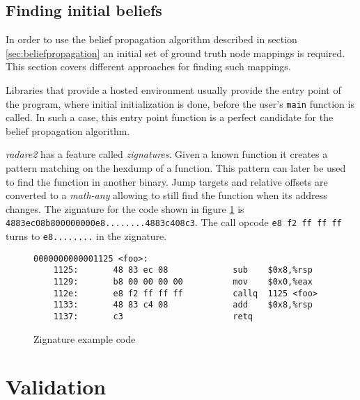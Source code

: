 \documentclass[
    12pt,                               %
    DIV=14,                     %
    parskip=half+,              %
    bigheadings,                %
    cleardoubleempty,   %
    halfparskip,                %
    ]{scrreprt} %
\begin{document}
\section{Finding initial beliefs} \label{sec:findtruth}
In order to use the belief propagation algorithm described in section \ref{sec:beliefpropagation} an initial set of ground truth node mappings is required. This section covers different approaches for finding such mappings.

Libraries that provide a hosted environment usually provide the entry point of the program, where initial initialization is done, before the user's \verb'main' function is called. In such a case, this entry point function is a perfect candidate for the belief propagation algorithm.

\textit{radare2} has a feature called \textit{zignatures}\cite{zignatures}. Given a known function it creates a pattern matching on the hexdump of a function. This pattern can later be used to find the function in another binary. Jump targets and relative offsets are converted to a \textit{math-any} allowing to still find the function when its address changes. The zignature for the code shown in figure \ref{fig:zignatures} is \verb'4883ec08b800000000e8........4883c408c3'. The call opcode \verb'e8 f2 ff ff ff' turns to \verb'e8........' in the zignature.

\begin{figure}[H]
	\begin{lstlisting}
0000000000001125 <foo>:
    1125:       48 83 ec 08             sub    $0x8,%rsp
    1129:       b8 00 00 00 00          mov    $0x0,%eax
    112e:       e8 f2 ff ff ff          callq  1125 <foo>
    1133:       48 83 c4 08             add    $0x8,%rsp
    1137:       c3                      retq
	\end{lstlisting}
	\caption{Zignature example code}
	\label{fig:zignatures}
\end{figure}


\chapter{Validation} \label{chap:validation}
\end{document}
